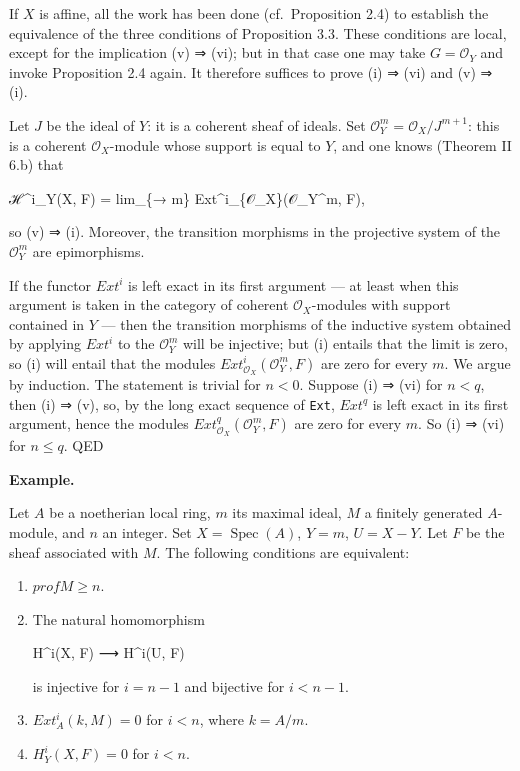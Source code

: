 \documentclass[
  11pt,
  a4paper,
]{book}
\newenvironment{Shaded}{}{}
\newcommand{\NormalTok}[1]{#1}
\begin{document}
If \(X\) is affine, all the work has been done (cf.~Proposition 2.4) to
establish the equivalence of the three conditions of Proposition 3.3.
These conditions are local, except for the implication (v) ⇒ (vi); but
in that case one may take \(G
= \mathcal{O}_{Y}\) and invoke Proposition 2.4 again. It therefore
suffices to prove (i) ⇒ (vi) and (v) ⇒ (i).

Let \(J\) be the ideal of \(Y\): it is a coherent sheaf of ideals. Set
\(\mathcal{O}^{m}_{Y} = \mathcal{O}_{X}/J^{m+1}\): this is a coherent
\(\mathcal{O}_{X}\)-module whose support is equal to \(Y\), and one
knows (Theorem II 6.b) that

\begin{Shaded}
\begin{Highlighting}[]
\NormalTok{ℋ\^{}i\_Y(X, F) = lim\_\{→ m\} Ext\^{}i\_\{𝒪\_X\}(𝒪\_Y\^{}m, F),}
\end{Highlighting}
\end{Shaded}

so (v) ⇒ (i). Moreover, the transition morphisms in the projective
system of the \(\mathcal{O}^{m}_{Y}\) are epimorphisms.

If the functor \(Ext^{i}\) is left exact in its first argument --- at
least when this argument is taken in the category of coherent
\(\mathcal{O}_{X}\)-modules with support contained in \(Y\) --- then the
transition morphisms of the inductive system obtained by applying
\(Ext^{i}\) to the \(\mathcal{O}^{m}_{Y}\) will be injective; but (i)
entails that the limit is zero, so (i) will entail that the modules
\(Ext^{i}_{\mathcal{O}_{X}}(\mathcal{O}^{m}_{Y}, F)\) are zero for every
\(m\). We argue by induction. The statement is trivial for \(n < 0\).
Suppose (i) ⇒ (vi) for \(n < q\), then (i) ⇒ (v), so, by the long exact
sequence of \texttt{Ext}, \(Ext^{q}\) is left exact in its first
argument, hence the modules
\(Ext^{q}_{\mathcal{O}_{X}}(\mathcal{O}^{m}_{Y}, F)\) are zero for every
\(m\). So (i) ⇒ (vi) for \(n \leqslant q\). QED

\textbf{Example.}

Let \(A\) be a noetherian local ring, \(m\) its maximal ideal, \(M\) a
finitely generated \(A\)-module, and \(n\) an integer. Set
\(X = \operatorname{Spec}(A)\), \(Y = {m}\), \(U = X - Y\). Let \(F\) be
the sheaf associated with \(M\). The following conditions are
equivalent:

\begin{enumerate}
\def\labelenumi{\arabic{enumi}.}
\item
  \(prof M \geqslant n\).
\item
  The natural homomorphism

\begin{Shaded}
\begin{Highlighting}[]
\NormalTok{H\^{}i(X, F) ⟶ H\^{}i(U, F)}
\end{Highlighting}
\end{Shaded}

  is injective for \(i = n - 1\) and bijective for \(i < n - 1\).
\item
  \(Ext^{i}_{A}(k, M) = 0\) for \(i < n\), where \(k = A/m\).
\item
  \(H^{i}_{Y}(X, F) = 0\) for \(i < n\).
\end{enumerate}
\end{document}
